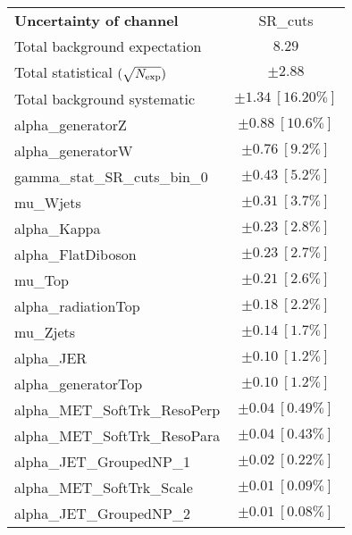 
\begin{table}
\begin{center}
\setlength{\tabcolsep}{0.0pc}
\begin{tabular*}{\textwidth}{@{\extracolsep{\fill}}lc}
\noalign{\smallskip}\hline\noalign{\smallskip}
{\bf Uncertainty of channel}                                    & SR\_cuts            \\
\noalign{\smallskip}\hline\noalign{\smallskip}
Total background expectation             &  $8.29$       \\
\noalign{\smallskip}\hline\noalign{\smallskip}
Total statistical $(\sqrt{N_{\rm exp}})$              & $\pm 2.88$       \\
Total background systematic               & $\pm 1.34\ [16.20\%] $             \\
\noalign{\smallskip}\hline\noalign{\smallskip}
\noalign{\smallskip}\hline\noalign{\smallskip}
alpha\_generatorZ         & $\pm 0.88\ [10.6\%] $       \\
alpha\_generatorW         & $\pm 0.76\ [9.2\%] $       \\
gamma\_stat\_SR\_cuts\_bin\_0         & $\pm 0.43\ [5.2\%] $       \\
mu\_Wjets         & $\pm 0.31\ [3.7\%] $       \\
alpha\_Kappa         & $\pm 0.23\ [2.8\%] $       \\
alpha\_FlatDiboson         & $\pm 0.23\ [2.7\%] $       \\
mu\_Top         & $\pm 0.21\ [2.6\%] $       \\
alpha\_radiationTop         & $\pm 0.18\ [2.2\%] $       \\
mu\_Zjets         & $\pm 0.14\ [1.7\%] $       \\
alpha\_JER         & $\pm 0.10\ [1.2\%] $       \\
alpha\_generatorTop         & $\pm 0.10\ [1.2\%] $       \\
alpha\_MET\_SoftTrk\_ResoPerp         & $\pm 0.04\ [0.49\%] $       \\
alpha\_MET\_SoftTrk\_ResoPara         & $\pm 0.04\ [0.43\%] $       \\
alpha\_JET\_GroupedNP\_1         & $\pm 0.02\ [0.22\%] $       \\
alpha\_MET\_SoftTrk\_Scale         & $\pm 0.01\ [0.09\%] $       \\
alpha\_JET\_GroupedNP\_2         & $\pm 0.01\ [0.08\%] $       \\

\end{tabular*}
\end{center}
\end{table}
